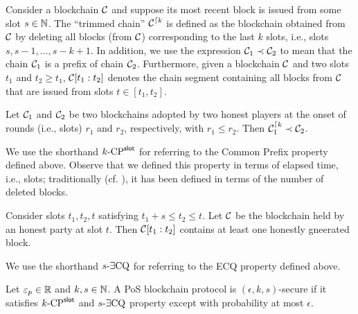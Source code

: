     Consider a blockchain $\mathcal{C}$ and suppose its most recent block is issued from some slot $s \in \mathbb{N}$. 
    The ``trimmed chain'' $\mathcal{C}^{\lceil {k}}$ is defined as 
    the blockchain obtained from $\mathcal{C}$ by deleting all blocks (from $\mathcal{C}$) 
    corresponding to the last $k$ slots, i.e., slots $s, s - 1, \ldots, s - k + 1$. 
    In addition, we use the expression $\mathcal{C}_1 \prec \mathcal{C}_2$ to mean that 
    the chain $\mathcal{C}_1$ is a prefix of chain $\mathcal{C}_2$. 
    Furthermore, given a blockchain $\mathcal{C}$ and two slots $t_1$ and $t_2 \geq t_1$, 
    $\mathcal{C}[t_1 : t_2]$ denotes the chain segment containing all blocks from $\mathcal{C}$ 
    that are issued from slots $t \in [t_1, t_2]$.

    \begin{definition}\label{def:cp}        
        Let $\mathcal{C}_1$ and $\mathcal{C}_2$ be two blockchains adopted by two honest players 
        at the onset of rounds (i.e., slots) $r_1$ and $r_2$, respectively, with $r_1 \leq r_2$. 
        Then $\mathcal{C}_1^{\lceil {k}} \prec \mathcal{C}_2$. 
    \end{definition}
    We use the shorthand ${k}\text{-}\mathrm{CP}^{\mathsf{slot}}$ for referring to the Common Prefix property defined above. 
    Observe that we defined this property in terms of elapsed time, i.e., slots; 
    traditionally (cf. \cite{C:GarKiaLeo17}), it has been defined in terms of the number of deleted blocks. 


    \begin{definition}\label{def:ECQ}        
        Consider slots $t_1, t_2, t$ satisfying $t_1 + s \leq t_2 \leq t$. 
        Let $\mathcal{C}$ be the blockchain held by an honest party at slot $t$. 
        Then $\mathcal{C}[t_1:t_2]$ contains at least one 
        honestly gneerated block.
    \end{definition}
    We use the shorthand ${s}\text{-}\exists\mathrm{CQ}$ for referring to the ECQ property defined above. 

    \begin{definition}\label{def:blockchain-security}
        Let $\mathsf{\varepsilon}_p \in \mathbb{R}$ and $k, s \in \mathbb{N}$. 
        A PoS blockchain protocol is $(\epsilon, k, s)$-secure if 
        it satisfies ${k}\text{-}\mathrm{CP}^{\mathsf{slot}}$ and ${s}\text{-}\exists\mathrm{CQ}$ property 
        except with probability at most $\epsilon$.
    \end{definition}


